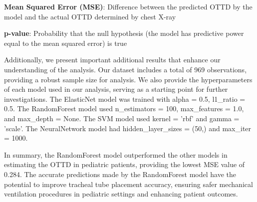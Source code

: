\documentclass[11pt]{article}
\begin{document}
\begin{table}[h]
\caption{Comparison of predictive power of different models}
\label{table:T1}
\begin{threeparttable}
\renewcommand{\TPTminimum}{\linewidth}
\begin{tablenotes}
\footnotesize
\item \textbf{Mean Squared Error (MSE)}: Difference between the predicted OTTD by the model and the actual OTTD determined by chest X-ray
\item \textbf{p-value}: Probability that the null hypothesis (the model has predictive power equal to the mean squared error) is true
\end{tablenotes}
\end{threeparttable}
\end{table}


Additionally, we present important additional results that enhance our understanding of the analysis. Our dataset includes a total of 969 observations, providing a robust sample size for analysis. We also provide the hyperparameters of each model used in our analysis, serving as a starting point for further investigations. The ElasticNet model was trained with alpha = 0.5, l1\_ratio = 0.5. The RandomForest model used n\_estimators = 100, max\_features = 1.0, and max\_depth = None. The SVM model used kernel = 'rbf' and gamma = 'scale'. The NeuralNetwork model had hidden\_layer\_sizes = (50,) and max\_iter = 1000.

In summary, the RandomForest model outperformed the other models in estimating the OTTD in pediatric patients, providing the lowest MSE value of 0.284. The accurate predictions made by the RandomForest model have the potential to improve tracheal tube placement accuracy, ensuring safer mechanical ventilation procedures in pediatric settings and enhancing patient outcomes.
\end{document}
